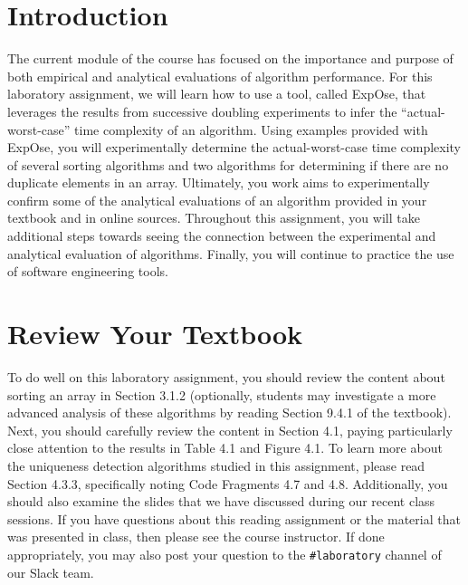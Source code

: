 

\usepackage[compact]{titlesec}


\section*{Introduction}

The current module of the course has focused on the importance and purpose of both empirical and analytical evaluations
of algorithm performance. For this laboratory assignment, we will learn how to use a tool, called {\sc ExpOse}, that
leverages the results from successive doubling experiments to infer the ``actual-worst-case'' time complexity of an
algorithm. Using examples provided with {\sc ExpOse}, you will experimentally determine the actual-worst-case time
complexity of several sorting algorithms and two algorithms for determining if there are no duplicate elements in an
array. Ultimately, you work aims to experimentally confirm some of the analytical evaluations of an algorithm provided
in your textbook and in online sources. Throughout this assignment, you will take additional steps towards seeing the
connection between the experimental and analytical evaluation of algorithms. Finally, you will continue to practice the
use of software engineering tools.

\section*{Review Your Textbook}

To do well on this laboratory assignment, you should review the content about sorting an array in Section 3.1.2
(optionally, students may investigate a more advanced analysis of these algorithms by reading Section 9.4.1 of the
textbook). Next, you should carefully review the content in Section 4.1, paying particularly close attention to the
results in Table 4.1 and Figure 4.1. To learn more about the uniqueness detection algorithms studied in this assignment,
please read Section 4.3.3, specifically noting Code Fragments 4.7 and 4.8.  Additionally, you should also examine the
slides that we have discussed during our recent class sessions. If you have questions about this reading assignment or
the material that was presented in class, then please see the course instructor. If done appropriately, you may also
post your question to the {\tt \#laboratory} channel of our Slack team.


